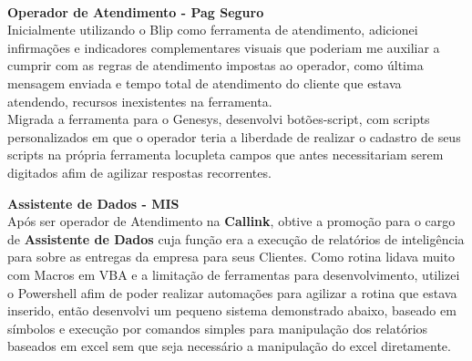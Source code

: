 \documentclass[12pt,a4paper,oneside,sumario=tradicional,brazil]{abntex2}
\begin{document}
\

	
	\indent
	\textbf{{\large Operador de Atendimento - Pag Seguro}} \\
	\indent
	Inicialmente utilizando o Blip como ferramenta de atendimento, adicionei infirmações e indicadores complementares visuais que poderiam me auxiliar a cumprir com as regras de atendimento impostas ao operador, como última mensagem enviada e tempo total de atendimento do cliente que estava atendendo, recursos inexistentes na ferramenta. \\
	Migrada a ferramenta para o Genesys, desenvolvi botões-script, com scripts personalizados em que o operador teria a liberdade de realizar o cadastro de seus scripts na própria ferramenta locupleta campos que antes necessitariam serem digitados afim de agilizar respostas recorrentes. \\
	
	\indent
	
	\indent
	\textbf{{\large Assistente de Dados - MIS}} \\
	\indent
	Após ser operador de Atendimento na \textbf{Callink}, obtive a promoção para o cargo de \textbf{Assistente de Dados} cuja função era a execução de relatórios de inteligência para sobre as entregas da empresa para seus Clientes. Como rotina lidava muito com Macros em VBA e a limitação de ferramentas para desenvolvimento, utilizei o Powershell afim de poder realizar automações para agilizar a rotina que estava inserido, então desenvolvi um pequeno sistema demonstrado abaixo, baseado em símbolos e execução por comandos simples para manipulação dos relatórios baseados em excel sem que seja necessário a manipulação do excel diretamente. \\
	
\end{document}
